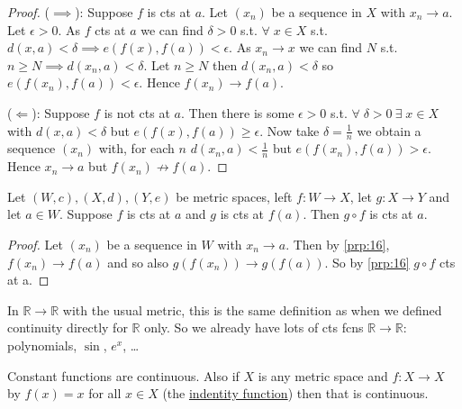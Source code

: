 \begin{proof}
    ($\implies$): Suppose $f$ is cts at $a$.
    Let $(x_n)$ be a sequence in $X$ with $x_n \to a$.
    Let $\epsilon > 0$.
    As $f$ cts at $a$ we can find $\delta > 0$ s.t. $\forall \; x \in X$ s.t. $d(x, a) < \delta \implies e(f(x), f(a)) < \epsilon$.
    As $x_n \to x$ we can find $N$ s.t. $n \geq N \implies d(x_n, a) < \delta$.
    Let $n \geq N$ then $d(x_n, a) < \delta$ so $e(f(x_n), f(a)) < \epsilon$.
    Hence $f(x_n) \to f(a)$.

    ($\Longleftarrow$): Suppose $f$ is not cts at $a$.
    Then there is some $\epsilon > 0$ s.t. $\forall \; \delta > 0 \ \exists \; x \in X$ with $d(x, a) < \delta$ but $e(f(x), f(a)) \geq \epsilon$.
    Now take $\delta = \frac{1}{n}$ we obtain a sequence $(x_n)$ with, for each $n$ $d(x_n, a) < \frac{1}{n}$ but $e(f(x_n), f(a)) > \epsilon$.
    Hence $x_n \to a$ but $f(x_n) \not\to f(a)$.
\end{proof} 

\begin{proposition} \label{prp:17}
    Let $(W, c), (X, d), (Y, e)$ be metric spaces, left $f: W \to X$, let $g: X \to Y$ and let $a \in W$.
    Suppose $f$ is cts at $a$ and $g$ is cts at $f(a)$.
    Then $g \circ f$ is cts at $a$.
\end{proposition} 

\begin{proof}
    Let $(x_n)$ be a sequence in $W$ with $x_n \to a$.
    Then by \cref{prp:16}, $f(x_n) \to f(a)$ and so also $g(f(x_n)) \to g(f(a))$.
    So by \cref{prp:16} $g \circ f$ cts at a. 
\end{proof} 

\begin{example} \label{exm:con1}
    In $\mathbb{R} \to \mathbb{R}$ with the usual metric, this is the same definition as when we defined continuity directly for $\mathbb{R}$ only.
    So we already have lots of cts fcns $\mathbb{R} \to \mathbb{R}$: polynomials, $\sin$, $e^x$, \dots
\end{example} 

\begin{example}
    Constant functions are continuous.
    Also if $X$ is any metric space and $f: X \to X$ by $f(x) = x$ for all $x \in X$ (the \underline{indentity function}) then that is continuous.
\end{example} 

